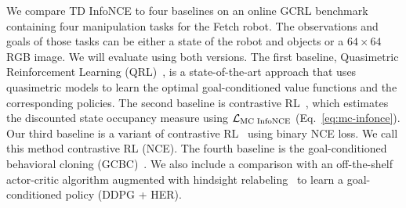 \documentclass{article} %
\begin{document}
We compare TD InfoNCE to four baselines on an online GCRL benchmark~\citep{plappert2018multi} containing four manipulation tasks for the Fetch robot. The observations and goals of those tasks can be either a state of the robot and objects or a $64 \times 64$ RGB image. We will evaluate using both versions. The first baseline, Quasimetric Reinforcement Learning (QRL)~\citep{pmlr-v202-wang23al}, is a state-of-the-art approach that uses quasimetric models to learn the optimal goal-conditioned value functions and the corresponding policies. The second baseline is contrastive RL~\citep{eysenbach2022contrastive}, which estimates the discounted state occupancy measure using ${\mathcal{L}}_\text{MC InfoNCE}$ (Eq.~\ref{eq:mc-infonce}). Our third baseline is a variant of contrastive RL~\citep{eysenbach2022contrastive} using binary NCE loss. We call this method contrastive RL (NCE). The fourth baseline is the goal-conditioned behavioral cloning (GCBC)~\citep{ding2019goal, emmons2021rvs, ghosh2020learning, lynch2020learning, sun2019policy, srivastava2019training}. We also include a comparison with an off-the-shelf actor-critic algorithm augmented with hindsight relabeling~\citep{andrychowicz2017hindsight, levy2018learning, riedmiller2018learning, schaul2015universal} to learn a goal-conditioned policy (DDPG + HER).
\end{document}
